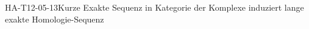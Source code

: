 
\begin{THEO}{HA-T12-05-13}{Kurze Exakte Sequenz in Kategorie der Komplexe induziert lange exakte Homologie-Sequenz}
\end{THEO}
